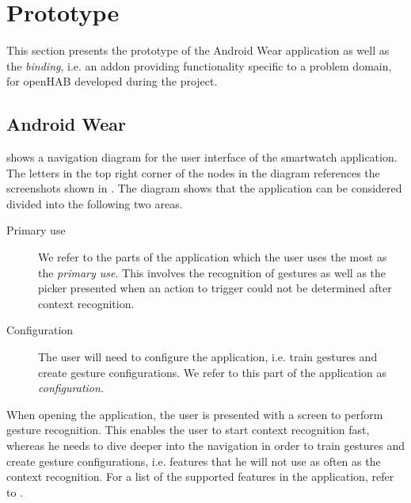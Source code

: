 \section{Prototype}
\label{sec:implementation:prototype}

This section presents the prototype of the Android Wear application as well as the \emph{binding}, i.e. an addon providing functionality specific to a problem domain, for openHAB developed during the project.

\subsection{Android Wear}
\label{sec:implementation:prototype:android-wear}

 shows a navigation diagram for the user interface of the smartwatch application. The letters in the top right corner of the nodes in the diagram references the screenshots shown in . The diagram shows that the application can be considered divided into the following two areas.

\begin{description}
\item[Primary use] We refer to the parts of the application which the user uses the most as the \emph{primary use}. This involves the recognition of gestures as well as the picker presented when an action to trigger could not be determined after context recognition.
\item[Configuration] The user will need to configure the application, i.e. train gestures and create gesture configurations. We refer to this part of the application as \emph{configuration}.
\end{description}

When opening the application, the user is presented with a screen to perform gesture recognition. This enables the user to start context recognition fast, whereas he needs to dive deeper into the navigation in order to train gestures and create gesture configurations, i.e. features that he will not use as often as the context recognition. For a list of the supported features in the application, refer to .

